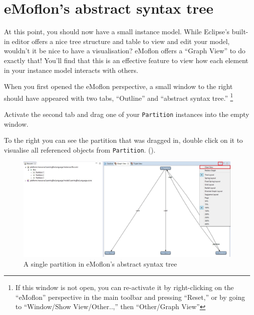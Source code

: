 \newpage
\section{eMoflon's abstract syntax tree}
\genHeader

At this point, you should now have a small instance model. While Eclipse's built-in editor offers a nice tree structure and table to view and edit your model,
wouldn't it be nice to have a visualisation? eMoflon offers a ``Graph View'' to do exactly that! You'll find that this is an effective
feature to view how each element in your instance model interacts with others.

\begin{stepbystep}

\item When you first opened the eMoflon perspective, a small window to the right should have appeared with two tabs, ``Outline'' and
``abstract syntax tree.'' \footnote{If this window is not open, you can re-activate it by right-clicking on the ``eMoflon'' perspective in the main toolbar and pressing
``Reset,'' or by going to ``Window/Show View/Other..,'' then ``Other/Graph View''} 

\item Activate the second tab and drag one of your \texttt{Partition} instances into the empty window. 

\item To the right you can see the partition that was dragged in, double click on it to visualise all referenced objects from \texttt{Partition}.
().

\vspace{0.5cm}

\begin{figure}[htbp]
	\centering
  \includegraphics[width=1.0\textwidth]{../../org.moflon.doc.handbook.02_leitnersLearningBox/4_graphView/gvImages/eclipse_graphViewInit}
	\caption{A single partition in eMoflon's abstract syntax tree}
	\label{eclipse:graphView_init}
\end{figure}


\end{stepbystep}

